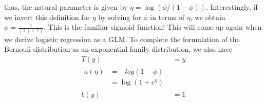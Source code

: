 \documentclass[12pt]{ctexart}%
\begin{document}
		thus, the natural parameter is given by $\eta = \log{(\phi/(1-\phi))}$. Interestingly, if we invert this definition for $\eta$ by solving for $\phi$ in terms of $\eta$, we obtain $\phi = \frac{1}{(1+e^{-\eta})}$. This is the familiar sigmoid function! This will come up again when we derive logistic regression as a GLM. To complete the formulation of the Bernouli distribution as an exponential family distribution, we also have 
		\begin{align}
			T(y) &= y\\
			\begin{split}
			a(\eta) &= -log(1-\phi)\\
					&= \log(1+e^\eta)
			\end{split}\\
			b(y) & = 1
		\end{align}
		
\end{document}
